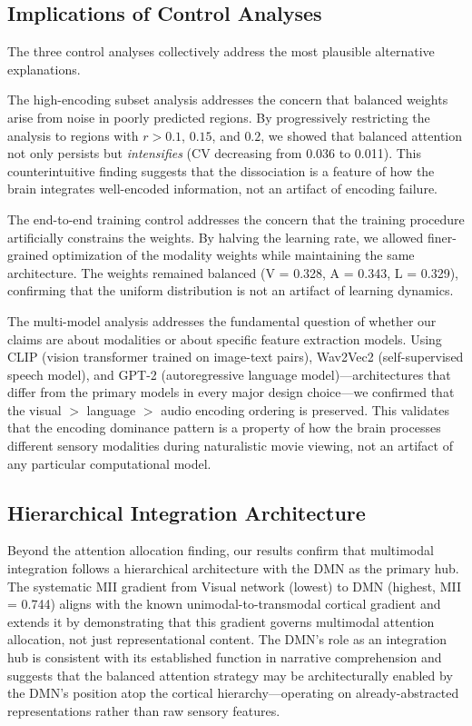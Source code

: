 \documentclass[conference]{IEEEtran}
\begin{document}
\subsection{Implications of Control Analyses}

The three control analyses collectively address the most plausible alternative explanations.

The high-encoding subset analysis addresses the concern that balanced weights arise from noise in poorly predicted regions. By progressively restricting the analysis to regions with $r > 0.1$, $0.15$, and $0.2$, we showed that balanced attention not only persists but \textit{intensifies} (CV decreasing from 0.036 to 0.011). This counterintuitive finding suggests that the dissociation is a feature of how the brain integrates well-encoded information, not an artifact of encoding failure.

The end-to-end training control addresses the concern that the training procedure artificially constrains the weights. By halving the learning rate, we allowed finer-grained optimization of the modality weights while maintaining the same architecture. The weights remained balanced (V = 0.328, A = 0.343, L = 0.329), confirming that the uniform distribution is not an artifact of learning dynamics.

The multi-model analysis addresses the fundamental question of whether our claims are about modalities or about specific feature extraction models. Using CLIP \cite{radford2021learning} (vision transformer trained on image-text pairs), Wav2Vec2 \cite{baevski2020wav2vec} (self-supervised speech model), and GPT-2 \cite{radford2019language} (autoregressive language model)---architectures that differ from the primary models in every major design choice---we confirmed that the visual $>$ language $>$ audio encoding ordering is preserved. This validates that the encoding dominance pattern is a property of how the brain processes different sensory modalities during naturalistic movie viewing, not an artifact of any particular computational model.

\subsection{Hierarchical Integration Architecture}

Beyond the attention allocation finding, our results confirm that multimodal integration follows a hierarchical architecture with the DMN as the primary hub. The systematic MII gradient from Visual network (lowest) to DMN (highest, MII = 0.744) aligns with the known unimodal-to-transmodal cortical gradient \cite{margulies2016situating} and extends it by demonstrating that this gradient governs multimodal attention allocation, not just representational content. The DMN's role as an integration hub is consistent with its established function in narrative comprehension \cite{simony2016dynamic} and suggests that the balanced attention strategy may be architecturally enabled by the DMN's position atop the cortical hierarchy---operating on already-abstracted representations rather than raw sensory features.
\end{document}
